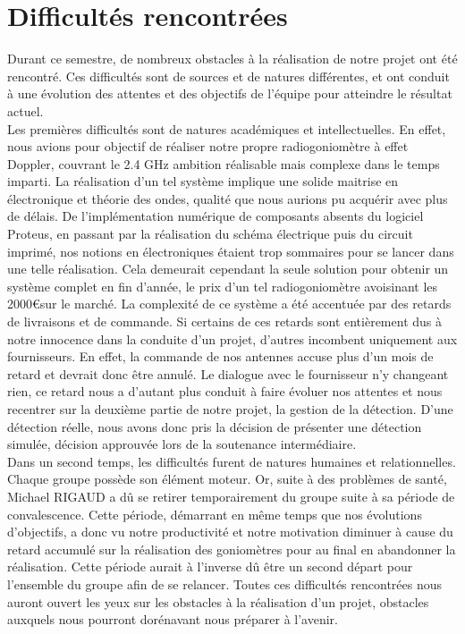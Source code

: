 
\chapter{Difficultés rencontrées}
\label{chap:difficulte}

Durant ce semestre, de nombreux obstacles à la réalisation de notre projet ont été rencontré. Ces difficultés sont de sources et de natures différentes, et ont conduit à une évolution des attentes et des objectifs de l’équipe pour atteindre le résultat actuel.~\\

Les premières difficultés sont de natures académiques et intellectuelles. En effet, nous avions pour objectif de réaliser notre propre radiogoniomètre à effet Doppler, couvrant le 2.4 GHz ambition réalisable mais complexe dans le temps imparti. La réalisation d’un tel système implique une solide maitrise en électronique et théorie des ondes, qualité que nous aurions pu acquérir avec plus de délais. De l’implémentation numérique de composants absents du logiciel Proteus, en passant par la réalisation du schéma électrique puis du circuit imprimé, nos notions en électroniques étaient trop sommaires pour se lancer dans une telle réalisation. Cela demeurait cependant la seule solution pour obtenir un système complet en fin d’année, le prix d’un tel radiogoniomètre avoisinant les 2000\euro sur le marché. 
La complexité de ce système a été accentuée par des retards de livraisons et de commande. Si certains de ces retards sont entièrement dus à notre innocence dans la conduite d’un projet, d’autres incombent uniquement aux fournisseurs. En effet, la commande de nos antennes accuse plus d’un mois de retard et devrait donc être annulé. Le dialogue avec le fournisseur n’y changeant rien, ce retard nous a d’autant plus conduit à faire évoluer nos attentes et nous recentrer sur la deuxième partie de notre projet, la gestion de la détection. D’une détection réelle, nous avons donc pris la décision de présenter une détection simulée, décision approuvée lors de la soutenance intermédiaire. 
~\\

Dans un second temps, les difficultés furent de natures humaines et relationnelles. Chaque groupe possède son élément moteur. Or, suite à des problèmes de santé, Michael RIGAUD a dû se retirer temporairement du groupe suite à sa période de convalescence. Cette période, démarrant en même temps que nos évolutions d’objectifs, a donc vu notre productivité et notre motivation diminuer à cause du retard accumulé sur la réalisation des goniomètres pour au final en abandonner la réalisation. Cette période aurait à l’inverse dû être un second départ pour l’ensemble du groupe afin de se relancer. 
Toutes ces difficultés rencontrées nous auront ouvert les yeux sur les obstacles à la réalisation d’un projet, obstacles auxquels nous pourront dorénavant nous préparer à l’avenir.


